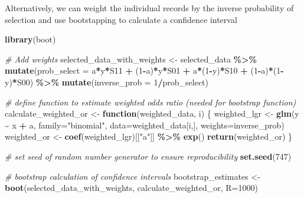 \documentclass[
]{book}
\newenvironment{Shaded}{\begin{snugshade}}{\end{snugshade}}
\newcommand{\AttributeTok}[1]{\textcolor[rgb]{0.13,0.29,0.53}{#1}}
\newcommand{\CommentTok}[1]{\textcolor[rgb]{0.56,0.35,0.01}{\textit{#1}}}
\newcommand{\ControlFlowTok}[1]{\textcolor[rgb]{0.13,0.29,0.53}{\textbf{#1}}}
\newcommand{\DecValTok}[1]{\textcolor[rgb]{0.00,0.00,0.81}{#1}}
\newcommand{\FunctionTok}[1]{\textcolor[rgb]{0.13,0.29,0.53}{\textbf{#1}}}
\newcommand{\NormalTok}[1]{#1}
\newcommand{\OtherTok}[1]{\textcolor[rgb]{0.56,0.35,0.01}{#1}}
\newcommand{\SpecialCharTok}[1]{\textcolor[rgb]{0.81,0.36,0.00}{\textbf{#1}}}
\newcommand{\StringTok}[1]{\textcolor[rgb]{0.31,0.60,0.02}{#1}}
\begin{document}
Alternatively, we can weight the individual records by the inverse probability of selection and use bootstapping to calculate a confidence interval

\begin{Shaded}
\begin{Highlighting}[]
\FunctionTok{library}\NormalTok{(boot)}

\CommentTok{\# Add weights}
\NormalTok{selected\_data\_with\_weights }\OtherTok{\textless{}{-}}\NormalTok{ selected\_data }\SpecialCharTok{\%\textgreater{}\%} 
  \FunctionTok{mutate}\NormalTok{(}\AttributeTok{prob\_select =}\NormalTok{ a}\SpecialCharTok{*}\NormalTok{y}\SpecialCharTok{*}\NormalTok{S11 }\SpecialCharTok{+}\NormalTok{ (}\DecValTok{1}\SpecialCharTok{{-}}\NormalTok{a)}\SpecialCharTok{*}\NormalTok{y}\SpecialCharTok{*}\NormalTok{S01 }\SpecialCharTok{+}\NormalTok{ a}\SpecialCharTok{*}\NormalTok{(}\DecValTok{1}\SpecialCharTok{{-}}\NormalTok{y)}\SpecialCharTok{*}\NormalTok{S10 }\SpecialCharTok{+}\NormalTok{ (}\DecValTok{1}\SpecialCharTok{{-}}\NormalTok{a)}\SpecialCharTok{*}\NormalTok{(}\DecValTok{1}\SpecialCharTok{{-}}\NormalTok{y)}\SpecialCharTok{*}\NormalTok{S00) }\SpecialCharTok{\%\textgreater{}\%}
  \FunctionTok{mutate}\NormalTok{(}\AttributeTok{inverse\_prob =} \DecValTok{1}\SpecialCharTok{/}\NormalTok{prob\_select) }

\CommentTok{\# define function to estimate weighted odds ratio (needed for bootstrap function)}
\NormalTok{calculate\_weighted\_or }\OtherTok{\textless{}{-}} \ControlFlowTok{function}\NormalTok{(weighted\_data, i) \{}
\NormalTok{  weighted\_lgr }\OtherTok{\textless{}{-}} \FunctionTok{glm}\NormalTok{(y }\SpecialCharTok{\textasciitilde{}}\NormalTok{ x }\SpecialCharTok{+}\NormalTok{ a, }\AttributeTok{family=}\StringTok{"binomial"}\NormalTok{, }\AttributeTok{data=}\NormalTok{weighted\_data[i,], }\AttributeTok{weights=}\NormalTok{inverse\_prob) }
\NormalTok{  weighted\_or }\OtherTok{\textless{}{-}} \FunctionTok{coef}\NormalTok{(weighted\_lgr)[[}\StringTok{"a"}\NormalTok{]] }\SpecialCharTok{\%\textgreater{}\%} \FunctionTok{exp}\NormalTok{()}
  \FunctionTok{return}\NormalTok{(weighted\_or)}
\NormalTok{\}}

\CommentTok{\# set seed of random number generator to ensure reproducibility}
\FunctionTok{set.seed}\NormalTok{(}\DecValTok{747}\NormalTok{)}

\CommentTok{\# bootstrap calculation of confidence intervals}
\NormalTok{bootstrap\_estimates }\OtherTok{\textless{}{-}} \FunctionTok{boot}\NormalTok{(selected\_data\_with\_weights, calculate\_weighted\_or, }\AttributeTok{R=}\DecValTok{1000}\NormalTok{)}


\end{Highlighting}
\end{Shaded}
\end{document}

